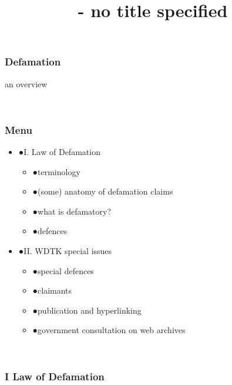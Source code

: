 \documentclass[ignorenonframetext,]{beamer}
\title{- no title specified}
\date{}
\begin{document}
\frame{\titlepage}

\begin{frame}


\end{frame}

\begin{frame}
\frametitle{{Defamation}}

{an overview}

~


\end{frame}

\begin{frame}
\frametitle{Menu}

\begin{itemize}
\item  {●}I. Law of Defamation

  \begin{itemize}
  \item    {●}terminology
  \item    {●}(some) anatomy of defamation claims
  \item    {●}what is defamatory?
  \item    {●}defences
  \end{itemize}
\item  {●}II. WDTK special issues

  \begin{itemize}
  \item    {●}special defences
  \item    {●}claimants
  \item    {●}publication and hyperlinking
  \item    {●}government consultation on web archives
  \end{itemize}
\end{itemize}

~


\end{frame}

\begin{frame}
\frametitle{{I Law of Defamation}}

~


\end{frame}
\end{document}
